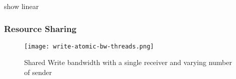 
show linear


\subsubsection{Resource Sharing}

\begin{figure}[h]
\texttt{[image: write-atomic-bw-threads.png]}
\caption{Shared Write bandwidth with a single receiver and varying number of sender}
\label{fig:plot-write-bw-unack}
\end{figure}





